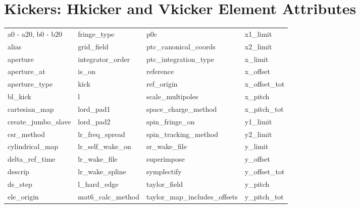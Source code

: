  \section{Kickers: Hkicker and Vkicker Element Attributes}
 \label{s:list.hvkicker}
 
 \begin{tabular}{llll} \toprule
a0 - a20, b0 - b20          & fringe_type                 & p0c                         & x1_limit                    \\
alias                       & grid_field                  & ptc_canonical_coords        & x2_limit                    \\
aperture                    & integrator_order            & ptc_integration_type        & x_limit                     \\
aperture_at                 & is_on                       & reference                   & x_offset                    \\
aperture_type               & kick                        & ref_origin                  & x_offset_tot                \\
bl_kick                     & l                           & scale_multipoles            & x_pitch                     \\
cartesian_map               & lord_pad1                   & space_charge_method         & x_pitch_tot                 \\
create_jumbo_slave          & lord_pad2                   & spin_fringe_on              & y1_limit                    \\
csr_method                  & lr_freq_spread              & spin_tracking_method        & y2_limit                    \\
cylindrical_map             & lr_self_wake_on             & sr_wake_file                & y_limit                     \\
delta_ref_time              & lr_wake_file                & superimpose                 & y_offset                    \\
descrip                     & lr_wake_spline              & symplectify                 & y_offset_tot                \\
ds_step                     & l_hard_edge                 & taylor_field                & y_pitch                     \\
ele_origin                  & mat6_calc_method            & taylor_map_includes_offsets & y_pitch_tot                 \\

\end{tabular}
